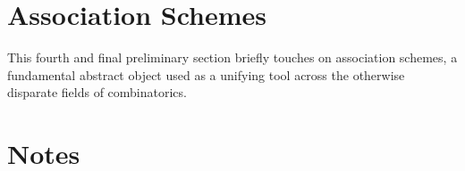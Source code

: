 \documentclass[../../main]{subfiles}
\begin{document}
\dinkus



\section{Association Schemes}

This fourth and final preliminary section briefly touches on association schemes, a fundamental abstract object used as a unifying tool across the otherwise disparate fields of combinatorics. 

\dinkus



\singlespace

\section*{\centering Notes}
\theanotes

\doublespacing

\biblio
\end{document}
